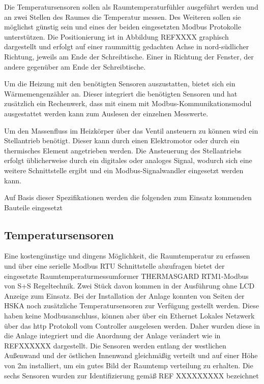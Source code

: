 Die Temperatursensoren sollen als Raumtemperaturfühler ausgeführt werden und an zwei Stellen des Raumes die Temperatur messen. Des Weiteren sollen sie möglichst günstig sein und eines der beiden eingesetzten Modbus Protokolle unterstützen. Die Positionierung ist in Abbildung REFXXXX graphisch dargestellt und erfolgt auf einer raummittig gedachten Achse in nord-südlicher Richtung, jeweils am Ende der Schreibtische. Einer in Richtung der Fenster, der andere gegenüber am Ende der Schreibtische.

Um die Heizung mit den benötigten Sensoren auszustatten, bietet sich ein Wärmemengenzähler an. Dieser integriert die benötigten Sensoren und hat zusätzlich ein Rechenwerk, dass mit einem mit Modbus-Kommunikationsmodul ausgestattet werden kann zum Auslesen der einzelnen Messwerte.

Um den Massenfluss im Heizkörper über das Ventil ansteuern zu können wird ein Stellantrieb benötigt. Dieser kann durch einen Elektromotor oder durch ein thermisches Element angetrieben werden. Die Ansteuerung des Stellantriebs erfolgt üblicherweise durch ein digitales oder analoges Signal, wodurch sich eine weitere Schnittstelle ergibt und ein Modbus-Signalwandler eingesetzt werden kann.

Auf Basis dieser Spezifikationen werden die folgenden zum Einsatz kommenden Bauteile eingesetzt

\subsection{Temperatursensoren}
Eine kostengünstige und  dingens Möglichkeit, die Raumtemperatur zu erfassen und über eine serielle Modbus RTU Schnittstelle abzufragen bietet der eingesetzte Raumtemperaturmessumformer THERMASGARD RTM1-Modbus von S+S Regeltechnik. Zwei Stück davon kommen in der Ausführung ohne LCD Anzeige zum Einsatz. 
Bei der Installation der Anlage konnten von Seiten der HSKA noch zusätzliche Temperatursensoren zur Verfügung gestellt werden. Diese haben keine Modbusanschluss, können aber über ein Ethernet Lokales Netzwerk über das http Protokoll vom Controller ausgelesen werden. Daher wurden diese in die Anlage integriert und die Anordnung der Anlage verändert wie in REFXXXXXX dargestellt. Die Sensoren werden entlang der westlichen Außenwand und der östlichen Innenwand gleichmäßig verteilt und auf einer Höhe von 2m installiert, um ein gutes Bild der Raumtemp verteilung zu erhalten. Die sechs Sensoren wurden zur Identifizierung gemäß REF XXXXXXXXX bezeichnet

